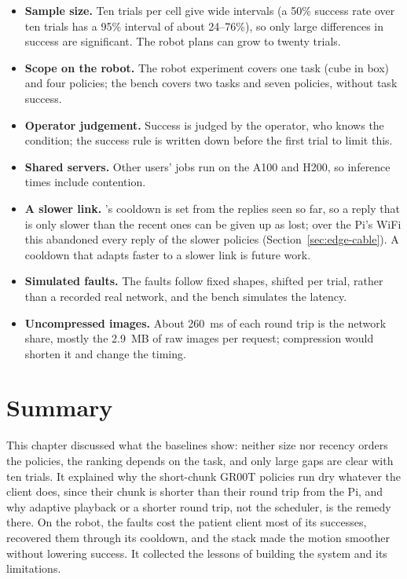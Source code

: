 \begin{itemize}
\item \textbf{Sample size.} Ten trials per cell give wide intervals (a 50\% success rate over ten trials has a 95\%
      interval of about 24--76\%), so only large differences in success are significant. The robot plans can grow to
      twenty trials.
\item \textbf{Scope on the robot.} The robot \drtc{} experiment covers one task (cube in box) and four policies; the bench covers two
      tasks and seven policies, without task success.
\item \textbf{Operator judgement.} Success is judged by the operator, who knows the condition; the success rule is
      written down before the first trial to limit this.
\item \textbf{Shared servers.} Other users' jobs run on the A100 and H200, so inference times include contention.
\item \textbf{A slower link.} \drtc's cooldown is set from the replies seen so far, so a reply that is only slower
      than the recent ones can be given up as lost; over the Pi's WiFi this abandoned every reply of the slower
      policies (Section~\ref{sec:edge-cable}). A cooldown that adapts faster to a slower link is future work.
\item \textbf{Simulated faults.} The faults follow fixed shapes, shifted per trial, rather than a recorded real network,
      and the bench simulates the latency.
\item \textbf{Uncompressed images.} About 260~ms of each round trip is the network share, mostly the 2.9~MB of raw
      images per request; compression would shorten it and change the timing.
\end{itemize}

\section{Summary}
This chapter discussed what the baselines show: neither size nor recency orders the policies, the ranking depends on
the task, and only large gaps are clear with ten trials. It explained why the short-chunk GR00T policies run dry
whatever the client does, since their chunk is shorter than their round trip from the Pi, and why adaptive playback
or a shorter round trip, not the scheduler, is the remedy there. On the robot, the faults cost the patient client most of its
successes, \drtc{} recovered them through its cooldown, and the stack made the motion smoother without lowering
success. It collected the lessons of building the system and its limitations.
